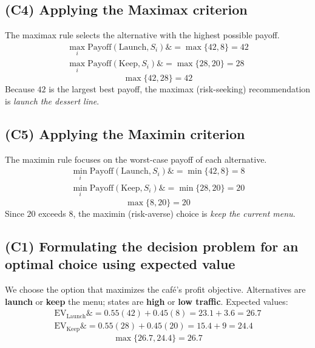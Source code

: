 \documentclass[11pt]{article}
\begin{document}
	\subsection*{(C4) Applying the Maximax criterion}
	
	\hypertarget{problem1-c4}{}
	
	The maximax rule selects the alternative with the highest possible payoff.
	\[
	\begin{aligned}
		\max_i \text{Payoff}(\text{Launch}, S_i) \&= \max\{42, 8\} = 42 \\
		\max_i \text{Payoff}(\text{Keep}, S_i) \&= \max\{28, 20\} = 28
	\end{aligned}
	\]
	\[
	\max\{42, 28\} = 42
	\]
Because $42$ is the largest best payoff, the maximax (risk-seeking) recommendation is \emph{launch the dessert line}.
	
	\subsection*{(C5) Applying the Maximin criterion}
	
	\hypertarget{problem1-c5}{}
	
	The maximin rule focuses on the worst-case payoff of each alternative.
	\[
	\begin{aligned}
		\min_i \text{Payoff}(\text{Launch}, S_i) \&= \min\{42, 8\} = 8 \\
		\min_i \text{Payoff}(\text{Keep}, S_i) \&= \min\{28, 20\} = 20
	\end{aligned}
	\]
	\[
	\max\{8, 20\} = 20
	\]
Since $20$ exceeds $8$, the maximin (risk-averse) choice is \emph{keep the current menu}.
	
	\subsection*{(C1) Formulating the decision problem for an optimal choice using expected value}
	
	\hypertarget{problem1-c1}{}
	
	We choose the option that maximizes the café's profit objective. Alternatives are \textbf{launch} or
	\textbf{keep} the menu; states are \textbf{high} or \textbf{low traffic}. Expected values:
	\[
	\begin{aligned}
		\mathrm{EV}_{\text{Launch}} \&= 0.55(42) + 0.45(8) = 23.1 + 3.6 = 26.7 \\
		\mathrm{EV}_{\text{Keep}} \&= 0.55(28) + 0.45(20) = 15.4 + 9 = 24.4
	\end{aligned}
	\]
	\[
	\max\{26.7, 24.4\} = 26.7
	\]
	
\end{document}
